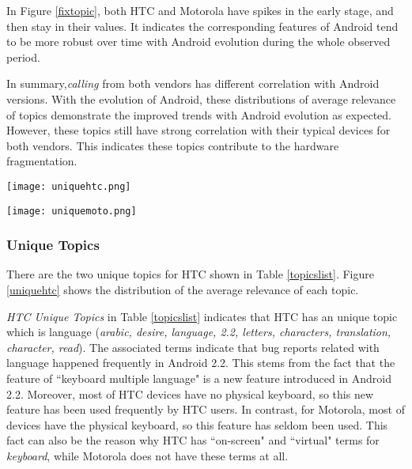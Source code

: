 \documentclass[10pt, conference, compsocconf]{IEEEtran}
\begin{document}
In Figure \ref{fixtopic}, both HTC and Motorola have spikes in the early stage, and then stay in their values. It indicates the corresponding features of Android tend to be more robust over time with Android evolution during the whole observed period.

In summary,\textit{calling} from both vendors has different correlation with Android versions. With the evolution of Android, these distributions of average relevance of topics demonstrate the improved trends with Android evolution as expected. However, these topics still have strong correlation with their typical devices for both vendors. This indicates these topics contribute to the hardware fragmentation.





\begin{figure*}[htb]
\centering
\texttt{[image: uniquehtc.png]}
\caption{Unique Topics relevance in HTC}
\label{uniquehtc}
\end{figure*}

\begin{figure*}[htb]
\centering
\texttt{[image: uniquemoto.png]}
\caption{Unique Topics relevance in Motorola}
\label{uniquemoto}
\end{figure*}


\subsubsection{Unique Topics}

There are the two unique topics for HTC shown in Table \ref{topicslist}. Figure \ref{uniquehtc} shows the distribution of the average relevance of each topic.

\textit{HTC Unique Topics} in Table \ref{topicslist} indicates that HTC has an unique topic which is language (\textit{arabic, desire, language, 2.2, letters, characters, translation, character, read}). The associated terms indicate that bug reports related with language happened frequently in Android 2.2. This stems from the fact that the feature of ``keyboard multiple language" is a new feature introduced in Android 2.2. Moreover, most of HTC devices have no physical keyboard, so this new feature has been used frequently by HTC users. In contrast, for Motorola, most of devices have the physical keyboard, so this feature has seldom been used. This fact can also be the reason why HTC has ``on-screen" and ``virtual" terms for \textit{keyboard}, while Motorola does not have these terms at all.
\end{document}

